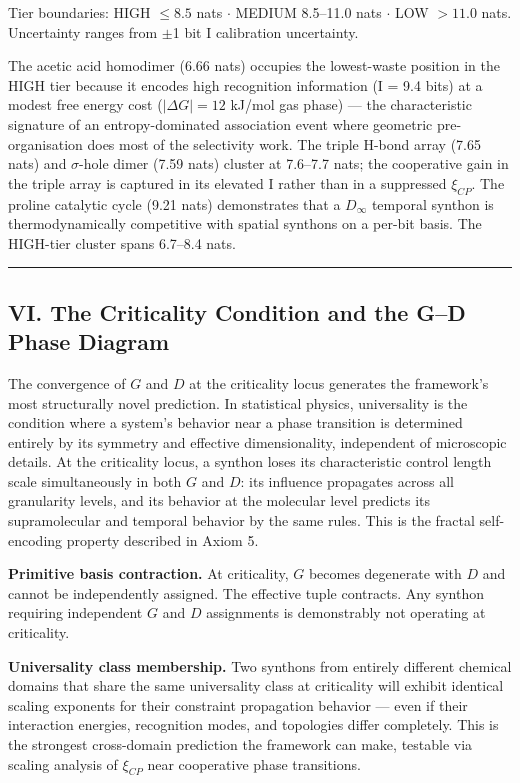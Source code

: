 \documentclass[12pt,a4paper]{article}
\begin{document}
Tier boundaries: HIGH $\leq 8.5$ nats $\cdot$ MEDIUM 8.5--11.0 nats $\cdot$ LOW $> 11.0$ nats. Uncertainty ranges from $\pm$1 bit I calibration uncertainty.

The acetic acid homodimer (6.66 nats) occupies the lowest-waste position in the HIGH tier because it encodes high recognition information (I = 9.4 bits) at a modest free energy cost ($|\Delta G| = 12$ kJ/mol gas phase) --- the characteristic signature of an entropy-dominated association event where geometric pre-organisation does most of the selectivity work. The triple H-bond array (7.65 nats) and $\sigma$-hole dimer (7.59 nats) cluster at 7.6--7.7 nats; the cooperative gain in the triple array is captured in its elevated I rather than in a suppressed $\xi_{CP}$. The proline catalytic cycle (9.21 nats) demonstrates that a $D_{\infty}$ temporal synthon is thermodynamically competitive with spatial synthons on a per-bit basis. The HIGH-tier cluster spans 6.7--8.4 nats.

\begin{center}
\rule{0.5\textwidth}{0.4pt}
\end{center}

\subsection{VI. The Criticality Condition and the G--D Phase Diagram}

The convergence of $G$ and $D$ at the criticality locus generates the framework's most structurally novel prediction. In statistical physics, universality is the condition where a system's behavior near a phase transition is determined entirely by its symmetry and effective dimensionality, independent of microscopic details. At the criticality locus, a synthon loses its characteristic control length scale simultaneously in both $G$ and $D$: its influence propagates across all granularity levels, and its behavior at the molecular level predicts its supramolecular and temporal behavior by the same rules. This is the fractal self-encoding property described in Axiom 5.

\textbf{Primitive basis contraction.} At criticality, $G$ becomes degenerate with $D$ and cannot be independently assigned. The effective tuple contracts. Any synthon requiring independent $G$ and $D$ assignments is demonstrably not operating at criticality.

\textbf{Universality class membership.} Two synthons from entirely different chemical domains that share the same universality class at criticality will exhibit identical scaling exponents for their constraint propagation behavior --- even if their interaction energies, recognition modes, and topologies differ completely. This is the strongest cross-domain prediction the framework can make, testable via scaling analysis of $\xi_{CP}$ near cooperative phase transitions.
\end{document}

